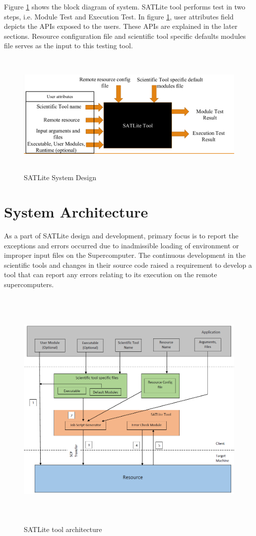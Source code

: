 \documentclass[10pt]{ruthesis}
\begin{document}
Figure \ref{fig:satdesign} shows the block diagram of system. SATLite tool performs test in two steps, i.e. Module Test and Execution Test. In figure \ref{fig:satdesign}, user attributes field depicts the APIs exposed to the users. These APIs are explained in the later sections. Resource configuration file and scientific tool specific defaults modules file serves as the input to this testing tool. 

\begin{figure}
  \centering
  \includegraphics[width=16cm,height=6cm]{satlite_design.png}
  \caption{SATLite System Design}
  \label{fig:satdesign}
\end{figure}

\section{System Architecture}
As a part of SATLite design and development, primary focus is to report the exceptions and errors occurred due to inadmissible loading of environment or improper input files on the Supercomputer. The continuous development in the scientific tools and changes in their source code raised a requirement to develop a tool that can report any errors relating to its execution on the remote supercomputers.

\begin{figure}
  \centering
  \includegraphics[width=14cm,height=12cm]{satlite.png}
  \caption{SATLite tool architecture}
  \label{fig:satarch}
\end{figure}
\end{document}
